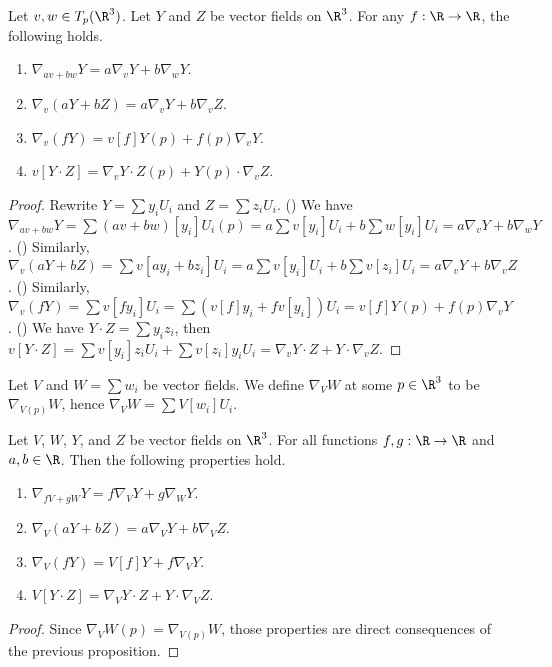 \documentclass[10pt]{article}
\begin{document}
\begin{proposition}
    Let $v,w\in{T}_{p}({\R}^{3})$. Let $Y$ and $Z$ be vector fields on ${\R}^{3}$. For any $f:\R\to\R$, the following holds.
    \begin{enumerate}
        \item ${\nabla}_{av+bw}Y=a{\nabla}_{v}Y+b{\nabla}_{w}Y$.
        \item ${\nabla}_{v}(aY+bZ)=a{\nabla}_{v}Y+b{\nabla}_{v}Z$.
        \item ${\nabla}_{v}(fY)=v[f]Y(p)+f(p){\nabla}_{v}Y$.
        \item $v[Y\cdot Z]={\nabla}_{v}Y\cdot Z(p)+Y(p)\cdot{\nabla}_{v}Z$.
    \end{enumerate}
\end{proposition}
\begin{proof}
    Rewrite $Y=\sum{y}_{i}{U}_{i}$ and $Z=\sum{z}_{i}{U}_{i}$. () We have ${\nabla}_{av+bw}Y=\sum(av+bw)[{y}_{i}]{U}_{i}(p)=a\sum v[{y}_{i}]{U}_{i}+b\sum w[{y}_{i}]{U}_{i}=a{\nabla}_{v}Y+b{\nabla}_{w}Y$. () Similarly, ${\nabla}_{v}(aY+bZ)=\sum v[a{y}_{i}+b{z}_{i}]{U}_{i}=a\sum v[{y}_{i}]{U}_{i}+b\sum v[{z}_{i}]{U}_{i}=a{\nabla}_{v}Y+b{\nabla}_{v}Z$. () Similarly, ${\nabla}_{v}(fY)=\sum v[f{y}_{i}]{U}_{i}=\sum(v[f]{y}_{i}+fv[{y}_{i}]){U}_{i}=v[f]Y(p)+f(p){\nabla}_{v}Y$. () We have $Y\cdot Z=\sum{y}_{i}{z}_{i}$, then $v[Y\cdot Z]=\sum v[{y}_{i}]{z}_{i}{U}_{i}+\sum v[{z}_{i}]{y}_{i}{U}_{i}={\nabla}_{v}Y\cdot Z+Y\cdot{\nabla}_{v}Z$.
\end{proof}
\par
Let $V$ and $W=\sum{w}_{i}$ be vector fields. We define ${\nabla}_{V}W$ at some $p\in{\R}^{3}$ to be ${\nabla}_{V(p)}W$, hence ${\nabla}_{V}W=\sum V[{w}_{i}]{U}_{i}$.
\begin{proposition}
    Let $V$, $W$, $Y$, and $Z$ be vector fields on ${\R}^{3}$. For all functions $f,g:\R\to\R$ and $a,b\in\R$. Then the following properties hold.
    \begin{enumerate}
        \item ${\nabla}_{fV+gW}Y=f{\nabla}_{V}Y+g{\nabla}_{W}Y$.
        \item ${\nabla}_{V}(aY+bZ)=a{\nabla}_{V}Y+b{\nabla}_{V}Z$.
        \item ${\nabla}_{V}(fY)=V[f]Y+f{\nabla}_{V}Y$.
        \item $V[Y\cdot Z]={\nabla}_{V}Y\cdot Z+Y\cdot{\nabla}_{V}Z$.
    \end{enumerate}
\end{proposition}
\begin{proof}
    Since ${\nabla}_{V}W(p)={\nabla}_{V(p)}W$, those properties are direct consequences of the previous proposition.
\end{proof}
\end{document}
